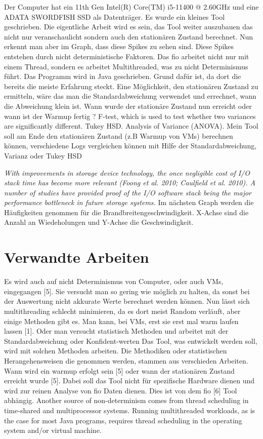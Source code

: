 \documentclass{article}
\begin{document}
Der Computer hat ein 11th Gen Intel(R) Core(TM) i5-11400 @ 2.60GHz und eine ADATA SWORDFISH SSD als Datenträger.
Es wurde ein kleines Tool geschrieben. Die eigentliche Arbeit wird es sein, das Tool weiter auszubauen das nicht nur veranschaulicht
sondern auch den stationären Zustand berechnet.
Nun erkennt man aber im Graph, dass diese Spikes zu sehen sind. Diese Spikes entstehen durch nicht deterministische Faktoren.
Das fio arbeitet nicht nur mit einem Thread, sondern es arbeitet Multithreaded, was zu nicht Determinismus führt. 
Das Programm wird in Java geschrieben. Grund dafür ist, da dort die bereits die meiste Erfahrung steckt.
Eine Möglichkeit, den stationären Zustand zu ermitteln, wäre das man die Standardabweichung verwendet und errechnet, wann die Abweichung klein ist.
Wann wurde der stationäre Zustand nun erreicht oder wann ist der Warmup fertig ? F-test,
which is used to test whether two variances are significantly different. Tukey HSD. Analysis of Variance (ANOVA). 
Mein Tool soll am Ende den stationären Zustand (z.B Warmup von VMs) berechnen können,
verschiedene Logs vergleichen können mit Hilfe der Standardabweichung, Varianz oder Tukey HSD

\textit{With improvements in storage device technology, the once negligible cost of I/O stack time has become more relevant (Foong et al. 2010; Caulfield et al. 2010). A number
of studies have provided proof of the I/O software stack being the major performance bottleneck in future storage systems.}
Im nächsten Graph werden die Häufigkeiten genommen für die Brandbreitengeschwindigkeit. X-Achse sind die Anzahl an Wiedeholungen und Y-Achse die Geschwindigkeit.
\section{Verwandte Arbeiten}
Es wird auch auf nicht Determinismus von Computer, oder auch VMs, eingegangen [5]. Sie versucht man so gering wie möglich zu halten, da sonst bei der Auswertung nicht akkurate Werte
berechnet werden können. Nun lässt sich multithreading schlecht minimieren, da es dort meist Random verläuft, aber einige Methoden gibt es. Man kann, bei VMs,
erst sie erst mal warm laufen  lassen [1]. Oder man versucht statistisch Methoden und arbeitet mit der Standardabweichung oder Konfident-werten
Das Tool, was entwickelt werden soll, wird mit solchen Methoden arbeiten. Die Methodiken oder statistischen Herangehensweisen die genommen werden,
stammen aus verschieden Arbeiten. Wann wird ein warmup erfolgt sein [5]
oder wann der stationären Zustand erreicht wurde [5]. Dabei soll das Tool nicht für spezifische Hardware dienen und wird zur reinen Analyse von fio Daten dienen. 
Dies ist von dem fio [6] Tool abhängig.
Another source of non-determinism comes from thread scheduling in time-shared and multiprocessor systems. Running multithreaded
workloads, as is the case for most Java programs, requires thread scheduling in the operating system and/or virtual machine.  
\newpage
\end{document}
